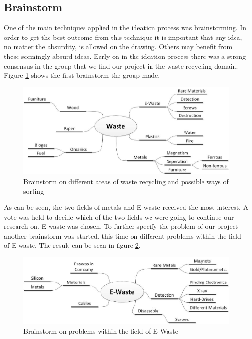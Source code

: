 \subsection{Brainstorm}
One of the main techniques applied in the ideation process was brainstorming. In order to get the best outcome from this technique it is important that any idea, no matter the absurdity, is allowed on the drawing. Others may benefit from these seemingly absurd ideas. Early on in the ideation process there was a strong consensus in the group that we find our project in the waste recycling domain. Figure \ref{fig:wasteTypesBrainstorm} shows the first brainstorm the group made.

\begin{figure}[!ht]
	\centering
	\includegraphics[scale=.5]{./graphics/wasteTypesBrainstorm.jpg}
	\caption{Brainstorm on different areas of waste recycling and possible ways of sorting}
	\label{fig:wasteTypesBrainstorm}
\end{figure}

As can be seen, the two fields of metals and E-waste received the most interest. A vote was held to decide which of the two fields we were going to continue our research on. E-waste was chosen. To further specify the problem of our project another brainstorm was started, this time on different problems within the field of E-waste. The result can be seen in figure \ref{fig:EWasteBrainstorm}.

\begin{figure}[!ht]
	\centering
	\includegraphics[scale=.5]{./graphics/EWasteBrainstorm.jpg}
	\caption{Brainstorm on problems within the field of E-Waste}
	\label{fig:EWasteBrainstorm}
\end{figure}

